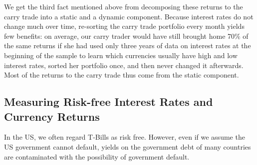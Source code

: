 \documentclass{ar-1col}
\begin{document}
We get the third fact mentioned above from decomposing these returns to the carry trade into a static and a dynamic component. Because interest rates do not change much over time, re-sorting the carry trade portfolio every month yields few benefits: on average, our carry trader would have still brought home 70\% of the same returns if she had used only three years of data on interest rates at the beginning of the sample to learn which currencies usually have high and low interest rates, sorted her portfolio once, and then never changed it afterwards. Most of the returns to the carry trade thus come from the static component.

\begin{textbox}[]\section{Measuring Risk-free Interest Rates and Currency Returns}
    In the US, we often regard T-Bills as risk free. However, even if we assume the US government cannot default, yields on the government debt of many countries are contaminated with the possibility of government default.


\end{textbox}
\end{document}
